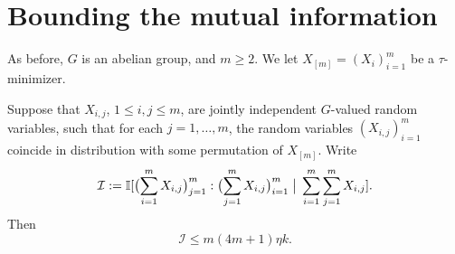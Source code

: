 \section{Bounding the mutual information}

As before, $G$ is an abelian group, and $m\geq 2$.  We let $X_{[m]} = (X_i)_{i =1}^m$ be a $\tau$-minimizer.

\begin{proposition}\label{key}\leanok
Suppose that $X_{i,j}$, $1 \leq i,j \leq m$, are jointly independent $G$-valued random variables, such that for each $j = 1,\dots,m$, the random variables $(X_{i,j})_{i = 1}^m$ coincide in distribution with some permutation of $X_{[m]}$.
  Write
  \[
    {\mathcal I} := \mathbb{I}[ \bigl(\sum_{i=1}^m X_{i,j}\bigr)_{j =1}^{m} : \bigl(\sum_{j=1}^m X_{i,j}\bigr)_{i = 1}^m \; \big| \; \sum_{i=1}^m \sum_{j = 1}^m  X_{i,j} ].
  \]
Then
  \begin{equation}\label{I-ineq}
    {\mathcal I} \leq m(4m+1) \eta k.
  \end{equation}
\end{proposition}



